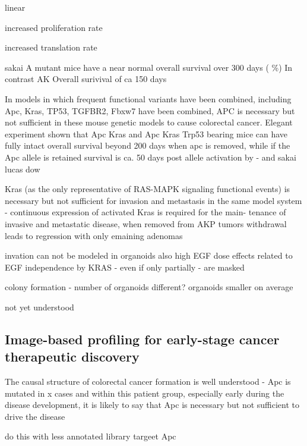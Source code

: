 \begin{flushleft}
linear


increased proliferation rate 


increased translation rate \citep{smitDriverMutationsAdenomacarcinoma2020a}

sakai 
A mutant mice have a near normal overall survival over 300 days ( \%) In contrast AK Overall surivival of ca 150 days 

In models in which frequent functional variants have been combined, including Apc, Kras, TP53, TGFBR2, Fbxw7 have been combined, APC is necessary but not sufficient in these mouse genetic models to cause colorectal cancer. Elegant experiment shown that Apc Kras and Apc Kras Trp53 bearing mice can have fully intact overall survival beyond 200 days when apc is removed, while if the Apc allele is retained survival is ca. 50 days post allele activation by \citep{dowApcRestorationPromotes2015a} - and sakai lucas dow  \citep{sakaiCombinedMutationApc2018a, matanoModelingColorectalCancer2015a, dowApcRestorationPromotes2015a}

Kras (as the only representative of RAS-MAPK signaling functional events) is necessary but not sufficient for invasion and metastasis in the same model system - 
continuous expression of activated Kras is required for the main- tenance of invasive and metastatic disease, when removed from AKP tumors
\citep{boutinOncogenicKrasDrives2017a} 
withdrawal leads to regression with only emaining adenomas 


invation can not be modeled in organoids
also high EGF dose
effects related to EGF independence by KRAS - even if only partially - are masked

colony formation - number of organoids different? 
organoids smaller on average 

not yet understood 





\subsection{Image-based profiling for early-stage cancer therapeutic discovery}
The causal structure of colorectal cancer formation is well understood - Apc is mutated in x cases and within this patient group, especially early during the disease development, it is likely to say that Apc is necessary but not sufficient to drive the disease


do this with less annotated library
targeet Apc





\end{flushleft}
